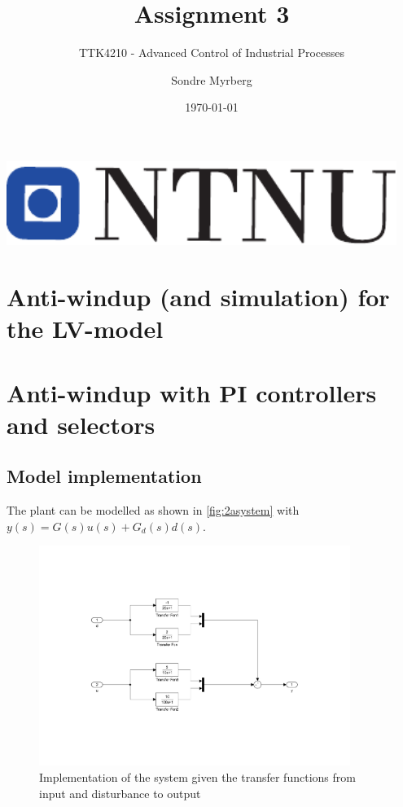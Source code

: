 \documentclass[a4paper]{scrartcl}
\title{Assignment 3}
\subtitle{TTK4210 - Advanced Control of Industrial Processes}
\author{Sondre Myrberg}
\date{\today}
\begin{document}
\hypersetup{pageanchor=false}
\begin{titlepage}
    \maketitle
    \vfill
    \vfill
    \vfill
    \vfill
    \vfill
    \includegraphics[width=0.95\textwidth]{../ntnu_logo.pdf}
    \vfill
    \vfill
\end{titlepage}
\hypersetup{pageanchor=true}

\section{Anti-windup (and simulation) for the LV-model}

\section{Anti-windup with PI controllers and selectors}
\subsection{Model implementation}
The plant can be modelled as shown in \autoref{fig:2asystem} with $y(s) = G(s)u(s) + G_d(s)d(s)$.
\begin{figure}[ht!]
	\centering
	\includegraphics[width=0.9\textwidth]{fig/simulink/system.pdf}
	\caption{Implementation of the system given the transfer functions from input and disturbance to output}
	\label{fig:2asystem}
\end{figure}
\end{document}
